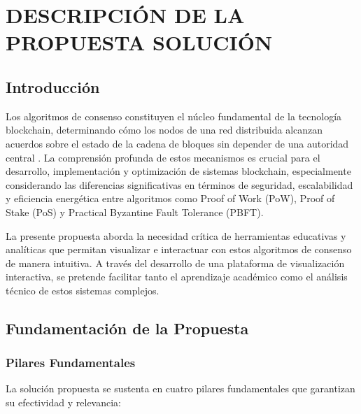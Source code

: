 
\chapter{DESCRIPCIÓN DE LA PROPUESTA SOLUCIÓN}

\section{Introducción}

Los algoritmos de consenso constituyen el núcleo fundamental de la tecnología blockchain, determinando cómo los nodos de una red distribuida alcanzan acuerdos sobre el estado de la cadena de bloques sin depender de una autoridad central \cite{nakamoto2008bitcoin}. La comprensión profunda de estos mecanismos es crucial para el desarrollo, implementación y optimización de sistemas blockchain, especialmente considerando las diferencias significativas en términos de seguridad, escalabilidad y eficiencia energética entre algoritmos como Proof of Work (PoW), Proof of Stake (PoS) y Practical Byzantine Fault Tolerance (PBFT).

La presente propuesta aborda la necesidad crítica de herramientas educativas y analíticas que permitan visualizar e interactuar con estos algoritmos de consenso de manera intuitiva. A través del desarrollo de una plataforma de visualización interactiva, se pretende facilitar tanto el aprendizaje académico como el análisis técnico de estos sistemas complejos.

\section{Fundamentación de la Propuesta}

\subsection{Pilares Fundamentales}

La solución propuesta se sustenta en cuatro pilares fundamentales que garantizan su efectividad y relevancia:

